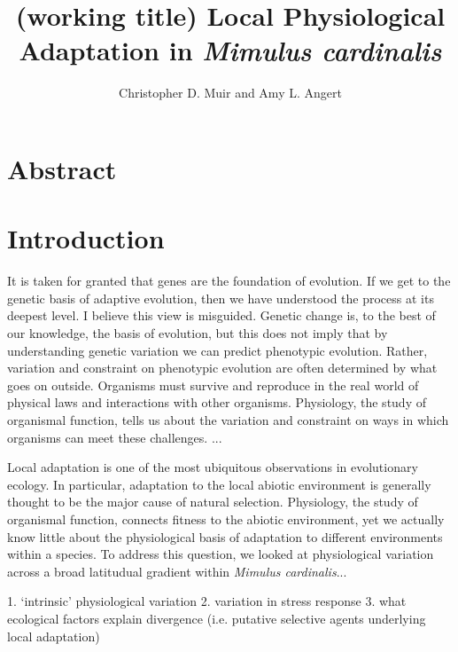 \documentclass[11pt, oneside]{article}
\title{(working title) Local Physiological Adaptation in \textit{Mimulus cardinalis}}
\author{Christopher D. Muir and Amy L. Angert}
\begin{document}
\maketitle

\section*{Abstract}

\section*{Introduction}

It is taken for granted that genes are the foundation of evolution. If we get to the genetic basis of adaptive evolution, then we have understood the process at its deepest level. I believe this view is misguided. Genetic change is, to the best of our knowledge, the basis of evolution, but this does not imply that by understanding genetic variation we can predict phenotypic evolution. Rather, variation and constraint on phenotypic evolution are often determined by what goes on outside. Organisms must survive and reproduce in the real world of physical laws and interactions with other organisms. Physiology, the study of organismal function, tells us about the variation and constraint on ways in which organisms can meet these challenges. ...

Local adaptation is one of the most ubiquitous observations in evolutionary ecology. In particular, adaptation to the local abiotic environment is generally thought to be the major cause of natural selection. Physiology, the study of organismal function, connects fitness to the abiotic environment, yet we actually know little about the physiological basis of adaptation to different environments within a species. To address this question, we looked at physiological variation across a broad latitudual gradient within \textit{Mimulus cardinalis}...

1. `intrinsic' physiological variation
2. variation in stress response
3. what ecological factors explain divergence (i.e. putative selective agents underlying local adaptation)



\end{document}
